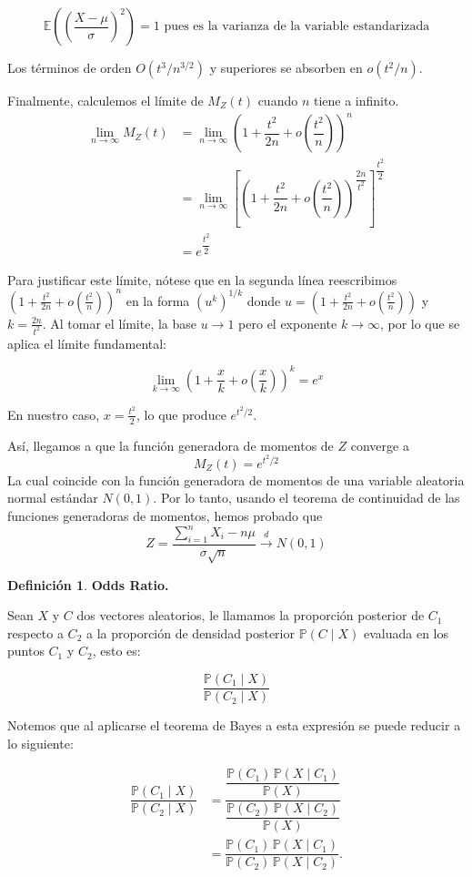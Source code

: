 \documentclass[
 12pt,
 letterpaper,
]{article}
\theoremstyle{teoremaBreak}
\theoremstyle{plain}
\theoremstyle{definition}
\newtheorem{definicion}[teorema]{Definición}
\begin{document}
$$\mathbb{E}\left(\left(\dfrac{X - \mu}{\sigma}\right)^2\right) = 1 \text{ pues es la varianza de la variable estandarizada}$$

Los términos de orden $O(t^3/n^{3/2})$ y superiores se absorben en $o(t^2/n)$.

Finalmente, calculemos el límite de $M_Z(t)$ cuando $n$ tiene a infinito.
\begin{align*}
\lim_{n \to \infty} M_Z(t) &= \lim_{n \to \infty} (1 + \dfrac{t^2}{2n} + o(\dfrac{t^2}{n}))^n \\
&= \lim_{n \to \infty} \left[\left(1 + \dfrac{t^2}{2n} + o(\dfrac{t^2}{n})\right)^{\dfrac{2n}{t^2}}\right]^{\dfrac{t^2}{2}} \\
&= e^{\dfrac{t^2}{2}}
\end{align*}

Para justificar este límite, nótese que en la segunda línea reescribimos $(1 + \frac{t^2}{2n} + o(\frac{t^2}{n}))^n$ en la forma $(u^{k})^{1/k}$ donde $u = (1 + \frac{t^2}{2n} + o(\frac{t^2}{n}))$ y $k = \frac{2n}{t^2}$. Al tomar el límite, la base $u \to 1$ pero el exponente $k \to \infty$, por lo que se aplica el límite fundamental:

$$\lim_{k \to \infty} \left(1 + \dfrac{x}{k} + o\left(\dfrac{x}{k}\right)\right)^k = e^x$$

En nuestro caso, $x = \frac{t^2}{2}$, lo que produce $e^{t^2/2}$.

Así, llegamos a que la función generadora de momentos de $Z$ converge a $$M_Z(t) = e^{t^2/2}$$
La cual coincide con la función generadora de momentos de una variable aleatoria normal estándar $N(0,1)$.
Por lo tanto, usando el teorema de continuidad de las funciones generadoras de momentos, hemos probado que 
$$Z = \dfrac{\sum_{i=1}^n X_i - n\mu}{\sigma \sqrt{n}} \xrightarrow{d} N(0,1)$$


\begin{definicion}
\textbf{Odds Ratio.}

Sean $X$ y $C$ dos vectores aleatorios, le llamamos la proporción posterior de $C_1$ respecto a $C_2$ a la proporción
de densidad posterior $\mathbb{P}(C \mid X)$ evaluada en los puntos $C_1$ y $C_2$, esto es:

\[
\dfrac{\mathbb{P}(C_1 \mid X)}{\mathbb{P}(C_2 \mid X)}
\]

Notemos que al aplicarse el teorema de Bayes a esta expresión se puede
reducir a lo siguiente:

\begin{align*}
\dfrac{\mathbb{P}(C_1\mid X)}{\mathbb{P}(C_2\mid X)}
&= \dfrac{\dfrac{\mathbb{P}(C_1)\,\mathbb{P}(X\mid C_1)}{\mathbb{P}(X)}}{\dfrac{\mathbb{P}(C_2)\,\mathbb{P}(X\mid C_2)}{\mathbb{P}(X)}} \\
&= \dfrac{\mathbb{P}(C_1)\,\mathbb{P}(X\mid C_1)}{\mathbb{P}(C_2)\,\mathbb{P}(X\mid C_2)}.
\end{align*}

\end{definicion}
\end{document}
